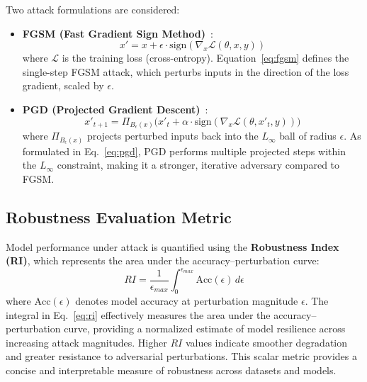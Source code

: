 \documentclass[a4paper,twoside]{article}
\begin{document}
Two attack formulations are considered:
\begin{itemize}
    \item \textbf{FGSM (Fast Gradient Sign Method)}~\cite{goodfellow2015explaining}: 
    \begin{equation}
    x' = x + \epsilon \cdot \text{sign}(\nabla_x \mathcal{L}(\theta, x, y))
    \label{eq:fgsm}
    \end{equation}
    where $\mathcal{L}$ is the training loss (cross-entropy). 
    Equation~\ref{eq:fgsm} defines the single-step FGSM attack, which perturbs inputs 
    in the direction of the loss gradient, scaled by $\epsilon$.
    
    \item \textbf{PGD (Projected Gradient Descent)}~\cite{madry2018towards}: 
    \begin{equation}
    x'_{t+1} = \Pi_{B_\epsilon(x)} \big(x'_t + \alpha \cdot \text{sign}(\nabla_x \mathcal{L}(\theta, x'_t, y)) \big)
    \label{eq:pgd}
    \end{equation}
    where $\Pi_{B_\epsilon(x)}$ projects perturbed inputs back into the $L_\infty$ ball 
    of radius $\epsilon$. 
    As formulated in Eq.~\ref{eq:pgd}, PGD performs multiple projected steps within the 
    $L_\infty$ constraint, making it a stronger, iterative adversary compared to FGSM.
\end{itemize}

\subsection{Robustness Evaluation Metric}

Model performance under attack is quantified using the \textbf{Robustness Index (RI)}, 
which represents the area under the accuracy--perturbation curve:
\begin{equation}
RI = \frac{1}{\epsilon_{max}} \int_0^{\epsilon_{max}} \text{Acc}(\epsilon) \, d\epsilon
\label{eq:ri}
\end{equation}
where $\text{Acc}(\epsilon)$ denotes model accuracy at perturbation magnitude $\epsilon$. 
The integral in Eq.~\ref{eq:ri} effectively measures the area under the 
accuracy–perturbation curve, providing a normalized estimate of model resilience 
across increasing attack magnitudes. 
Higher $RI$ values indicate smoother degradation and greater resistance 
to adversarial perturbations. 
This scalar metric provides a concise and interpretable measure of robustness 
across datasets and models.
\end{document}
